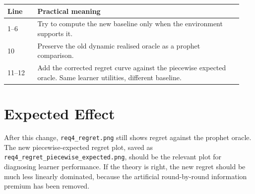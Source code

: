 \documentclass[10pt,a4paper]{article}
\begin{document}
\begin{tabular}{@{}p{0.12\linewidth}p{0.82\linewidth}@{}}
\toprule
Line & Practical meaning \\
\midrule
1--6 & Try to compute the new baseline only when the environment supports it. \\
10 & Preserve the old dynamic realised oracle as a prophet comparison. \\
11--12 & Add the corrected regret curve against the piecewise expected oracle. Same learner utilities, different baseline. \\
\bottomrule
\end{tabular}

\section{Expected Effect}
After this change, \texttt{req4\_regret.png} still shows regret against the prophet oracle. The new piecewise-expected regret plot, saved as \texttt{req4\_regret\_piecewise\_expected.png}, should be the relevant plot for diagnosing learner performance. If the theory is right, the new regret should be much less linearly dominated, because the artificial round-by-round information premium has been removed.
\end{document}
